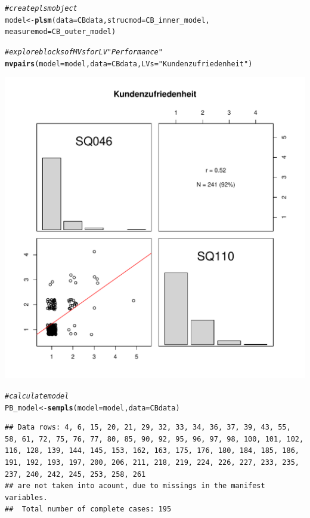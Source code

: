 \documentclass{article}\usepackage[]{graphicx}\usepackage[]{color}
\makeatletter
\def\maxwidth{ %
  \ifdim\Gin@nat@width>\linewidth
    \linewidth
  \else
    \Gin@nat@width
  \fi
}
\newcommand{\hlstr}[1]{\textcolor[rgb]{0.192,0.494,0.8}{#1}}%
\newcommand{\hlcom}[1]{\textcolor[rgb]{0.678,0.584,0.686}{\textit{#1}}}%
\newcommand{\hlstd}[1]{\textcolor[rgb]{0.345,0.345,0.345}{#1}}%
\newcommand{\hlkwb}[1]{\textcolor[rgb]{0.69,0.353,0.396}{#1}}%
\newcommand{\hlkwc}[1]{\textcolor[rgb]{0.333,0.667,0.333}{#1}}%
\newcommand{\hlkwd}[1]{\textcolor[rgb]{0.737,0.353,0.396}{\textbf{#1}}}%
\newenvironment{kframe}{%
 \def\at@end@of@kframe{}%
 \ifinner\ifhmode%
  \def\at@end@of@kframe{\end{minipage}}%
  \begin{minipage}{\columnwidth}%
 \fi\fi%
 \def\FrameCommand##1{\hskip\@totalleftmargin \hskip-\fboxsep
 \colorbox{shadecolor}{##1}\hskip-\fboxsep
     \hskip-\linewidth \hskip-\@totalleftmargin \hskip\columnwidth}%
 \MakeFramed {\advance\hsize-\width
   \@totalleftmargin\z@ \linewidth\hsize
   \@setminipage}}%
 {\par\unskip\endMakeFramed%
 \at@end@of@kframe}
\newenvironment{knitrout}{}{} %
\makeatother
\begin{document}
\begin{knitrout}
\begin{kframe}
\begin{alltt}
\hlcom{#create plsm object }
\hlstd{model} \hlkwb{<-} \hlkwd{plsm}\hlstd{(}\hlkwc{data} \hlstd{= CBdata,} \hlkwc{strucmod} \hlstd{= CB_inner_model,}
              \hlkwc{measuremod} \hlstd{= CB_outer_model)}

\hlcom{#explore blocks of MVs for LV "Performance"}
\hlkwd{mvpairs}\hlstd{(}\hlkwc{model} \hlstd{= model,} \hlkwc{data} \hlstd{= CBdata,} \hlkwc{LVs} \hlstd{=} \hlstr{"Kundenzufriedenheit"}\hlstd{)}
\end{alltt}
\end{kframe}
\includegraphics[width=\maxwidth]{figure/semPLS1} 
\begin{kframe}\begin{alltt}
\hlcom{#calculate model}
\hlstd{PB_model} \hlkwb{<-} \hlkwd{sempls}\hlstd{(}\hlkwc{model} \hlstd{= model,}\hlkwc{data} \hlstd{= CBdata)}
\end{alltt}
\begin{verbatim}
## Data rows: 4, 6, 15, 20, 21, 29, 32, 33, 34, 36, 37, 39, 43, 55, 58, 61, 72, 75, 76, 77, 80, 85, 90, 92, 95, 96, 97, 98, 100, 101, 102, 116, 128, 139, 144, 145, 153, 162, 163, 175, 176, 180, 184, 185, 186, 191, 192, 193, 197, 200, 206, 211, 218, 219, 224, 226, 227, 233, 235, 237, 240, 242, 245, 253, 258, 261 
## are not taken into acount, due to missings in the manifest variables.
##  Total number of complete cases: 195 

\end{verbatim}
\end{kframe}
\end{knitrout}
\end{document}
